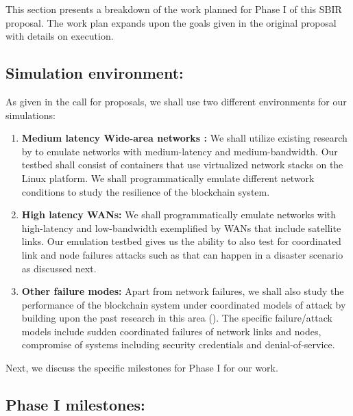 \label{sec:plan}
This section presents a breakdown of the work planned for Phase I of this SBIR proposal. The work plan expands upon the
goals given in the original proposal with details on execution. 

\subsection{Simulation environment:}

As given in the call for proposals, we shall use two different environments for our simulations:

\begin{enumerate}
    \item {\bf Medium latency Wide-area networks :} We shall utilize existing research by \cite{gustaf2013, haq2017}
to emulate networks with medium-latency and medium-bandwidth. Our testbed shall consist of 
containers that use virtualized network stacks on the Linux platform. We shall programmatically
emulate different network conditions to study the resilience of the blockchain system.

\item {\bf High latency WANs:}  We shall programmatically emulate networks with high-latency and low-bandwidth
exemplified by WANs that include satellite links. Our emulation testbed gives us the ability to also test for
coordinated link and node failures attacks such as that can happen in a disaster scenario as discussed next.
 
\item {\bf Other failure modes:} Apart from network failures, we shall also study the performance of the blockchain
    system under coordinated models of attack by building upon the past research in this area (\cite{xiao2006, niu2017,
        kurar2014, zhou2010}). The specific failure/attack models include sudden coordinated failures of network links and nodes,
compromise of systems including security credentials and denial-of-service.

\end{enumerate}

Next, we discuss the specific milestones for Phase I for our work. 

\subsection{Phase I milestones:}


